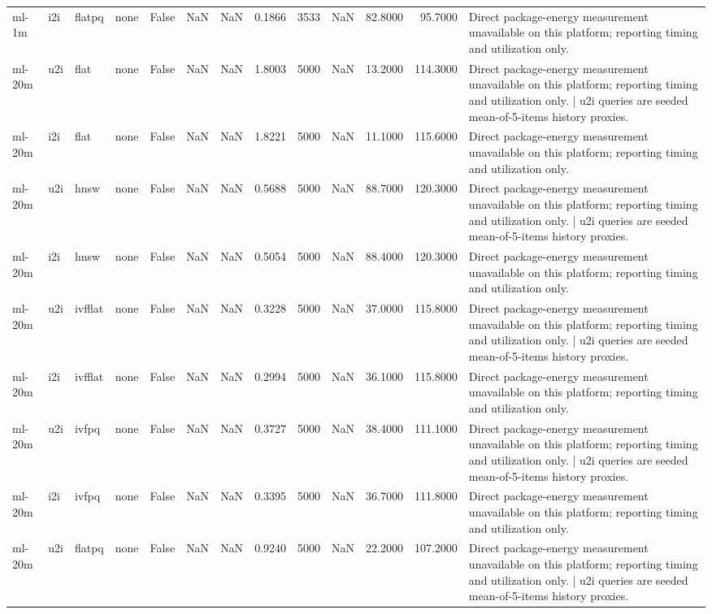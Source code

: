 \begin{tabular}{llllrrrrrrrrl}
ml-1m & i2i & flatpq & none & False & NaN & NaN & 0.1866 & 3533 & NaN & 82.8000 & 95.7000 & Direct package-energy measurement unavailable on this platform; reporting timing and utilization only. \\
ml-20m & u2i & flat & none & False & NaN & NaN & 1.8003 & 5000 & NaN & 13.2000 & 114.3000 & Direct package-energy measurement unavailable on this platform; reporting timing and utilization only. | u2i queries are seeded mean-of-5-items history proxies. \\
ml-20m & i2i & flat & none & False & NaN & NaN & 1.8221 & 5000 & NaN & 11.1000 & 115.6000 & Direct package-energy measurement unavailable on this platform; reporting timing and utilization only. \\
ml-20m & u2i & hnsw & none & False & NaN & NaN & 0.5688 & 5000 & NaN & 88.7000 & 120.3000 & Direct package-energy measurement unavailable on this platform; reporting timing and utilization only. | u2i queries are seeded mean-of-5-items history proxies. \\
ml-20m & i2i & hnsw & none & False & NaN & NaN & 0.5054 & 5000 & NaN & 88.4000 & 120.3000 & Direct package-energy measurement unavailable on this platform; reporting timing and utilization only. \\
ml-20m & u2i & ivfflat & none & False & NaN & NaN & 0.3228 & 5000 & NaN & 37.0000 & 115.8000 & Direct package-energy measurement unavailable on this platform; reporting timing and utilization only. | u2i queries are seeded mean-of-5-items history proxies. \\
ml-20m & i2i & ivfflat & none & False & NaN & NaN & 0.2994 & 5000 & NaN & 36.1000 & 115.8000 & Direct package-energy measurement unavailable on this platform; reporting timing and utilization only. \\
ml-20m & u2i & ivfpq & none & False & NaN & NaN & 0.3727 & 5000 & NaN & 38.4000 & 111.1000 & Direct package-energy measurement unavailable on this platform; reporting timing and utilization only. | u2i queries are seeded mean-of-5-items history proxies. \\
ml-20m & i2i & ivfpq & none & False & NaN & NaN & 0.3395 & 5000 & NaN & 36.7000 & 111.8000 & Direct package-energy measurement unavailable on this platform; reporting timing and utilization only. \\
ml-20m & u2i & flatpq & none & False & NaN & NaN & 0.9240 & 5000 & NaN & 22.2000 & 107.2000 & Direct package-energy measurement unavailable on this platform; reporting timing and utilization only. | u2i queries are seeded mean-of-5-items history proxies. \\

\end{tabular}
